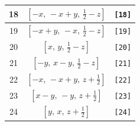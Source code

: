 \documentclass[fleqn,8pt]{jsarticle}
\begin{document}
\begin{longtable}{ccc}
18 & $\left[ - x,\, - x + y,\, \frac{1}{2} - z \right]$ & {\tt [18]} \\ \hline
19 & $\left[ - x + y,\, - x,\, \frac{1}{2} - z \right]$ & {\tt [19]} \\ \hline
20 & $\left[ x,\, y,\, \frac{1}{2} - z \right]$ & {\tt [20]} \\ \hline
21 & $\left[ - y,\, x - y,\, \frac{1}{2} - z \right]$ & {\tt [21]} \\ \hline
22 & $\left[ - x,\, - x + y,\, z + \frac{1}{2} \right]$ & {\tt [22]} \\ \hline
23 & $\left[ x - y,\, - y,\, z + \frac{1}{2} \right]$ & {\tt [23]} \\ \hline
24 & $\left[ y,\, x,\, z + \frac{1}{2} \right]$ & {\tt [24]} \\
\end{longtable}
\end{document}
